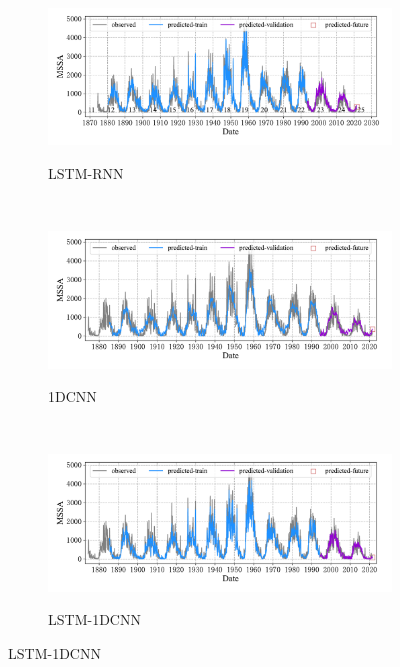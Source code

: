 \begin{figure}[!htbp]
  \centering
  \begin{subfigure}[b]{1.0\textwidth}
    \caption{LSTM-RNN} 
    \vspace{-0.35cm}
    \includegraphics[width=\textwidth]{Img/chap3_ss/ssa_series_in_72_out_1_layer_3_layersize_64_lstm.pdf}
    \label{fig:ssa_series_in_132_out_1_lstm}
  \end{subfigure}    \\
  \vspace{-1cm}
  \begin{subfigure}[b]{1.0\textwidth}
    \caption{1DCNN}
    \vspace{-0.35cm}
    \includegraphics[width=\textwidth]{Img/chap3_ss/ssa_series_in_132_out_1_cnn.pdf}
    \label{fig:ssa_series_in_132_out_1_cnn}
  \end{subfigure} \\
  \vspace{-1cm}
  \begin{subfigure}[b]{1.0\textwidth}
    \caption{LSTM-1DCNN}
    \vspace{-0.35cm}
    \includegraphics[width=\textwidth]{Img/chap3_ss/ssa_series_in_132_out_1_lstm_cnn.pdf}
    \label{fig:ssa_series_in_132_out_1_lstm_cnn}
    \end{subfigure}
  \vspace{-2cm}
  \label{fig:ssa_series_in_132_out_1}
\end{figure}

